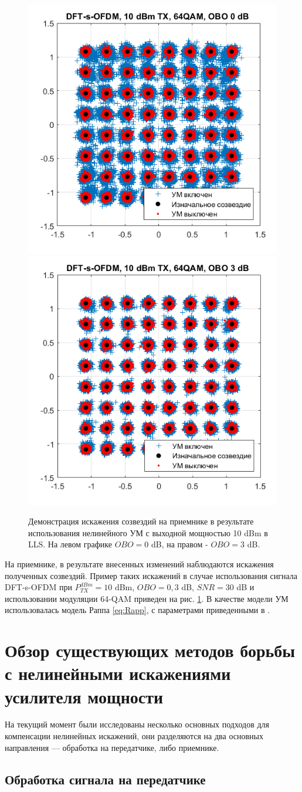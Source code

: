 \documentclass{unn}
\begin{document}
\begin{figure}[h!]
  \centering
  \includegraphics[width=0.35\linewidth]{figs/dfts_10dbm_obo0.png}
  \includegraphics[width=0.35\linewidth]{figs/dfts_10dbm_obo3.png}
  \caption{Демонстрация искажения созвездий на приемнике в результате
  использования нелинейного УМ с выходной мощностью 10 dBm в LLS. На левом
  графике $OBO=0$ dB, на правом - $OBO=3$ dB.}
  \label{fig:lls_rapp_distortions_10dbm}
\end{figure}

На приемнике, в результате внесенных изменений наблюдаются искажения
полученных созвездий. Пример таких искажений в случае
использования сигнала DFT-s-OFDM при $P^{dBm}_{TX} = 10$ dBm, $OBO = 0,3$
dB, $SNR=30$ dB и использовании модуляции 64-QAM приведен на рис.
\ref{fig:lls_rapp_distortions_10dbm}. В качестве модели УМ использовалась
модель Раппа \ref{eq:Rapp}, с параметрами приведенными в \cite{nokia163314}.


\section{Обзор существующих методов борьбы с нелинейными искажениями усилителя мощности}
На текущий момент были исследованы несколько основных подходов для
компенсации нелинейных искажений, они разделяются на два основных
направления — обработка на передатчике, либо приемнике.

\subsection{Обработка сигнала на передатчике}
\end{document}
